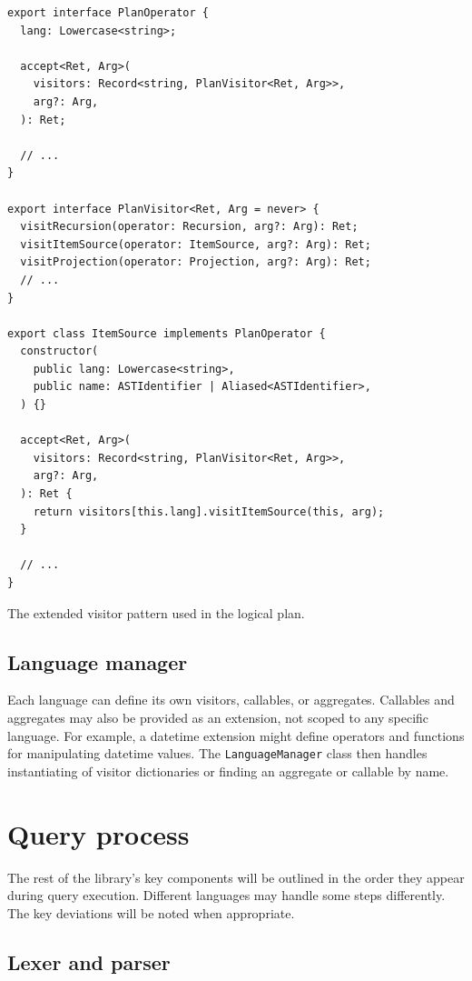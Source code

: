 \begin{listing}[ht!]
    \begin{verbatim}
export interface PlanOperator {
  lang: Lowercase<string>;

  accept<Ret, Arg>(
    visitors: Record<string, PlanVisitor<Ret, Arg>>,
    arg?: Arg,
  ): Ret;

  // ...
}
    
export interface PlanVisitor<Ret, Arg = never> {
  visitRecursion(operator: Recursion, arg?: Arg): Ret;
  visitItemSource(operator: ItemSource, arg?: Arg): Ret;
  visitProjection(operator: Projection, arg?: Arg): Ret;
  // ...
}

export class ItemSource implements PlanOperator {
  constructor(
    public lang: Lowercase<string>,
    public name: ASTIdentifier | Aliased<ASTIdentifier>,
  ) {}

  accept<Ret, Arg>(
    visitors: Record<string, PlanVisitor<Ret, Arg>>,
    arg?: Arg,
  ): Ret {
    return visitors[this.lang].visitItemSource(this, arg);
  }

  // ...
}
    \end{verbatim}
    \caption{The extended visitor pattern used in the logical plan.}
    \label{fig:visitor-pattern}
\end{listing}

\subsection{Language manager}

Each language can define its own visitors, callables, or aggregates. Callables and aggregates may also be provided as an extension, not scoped to any specific language. For example, a datetime extension might define operators and functions for manipulating datetime values. The \texttt{LanguageManager} class then handles instantiating of visitor dictionaries or finding an aggregate or callable by name.

\section{Query process}

The rest of the library's key components will be outlined in the order they appear during query execution. Different languages may handle some steps differently. The key deviations will be noted when appropriate.

\subsection{Lexer and parser}

